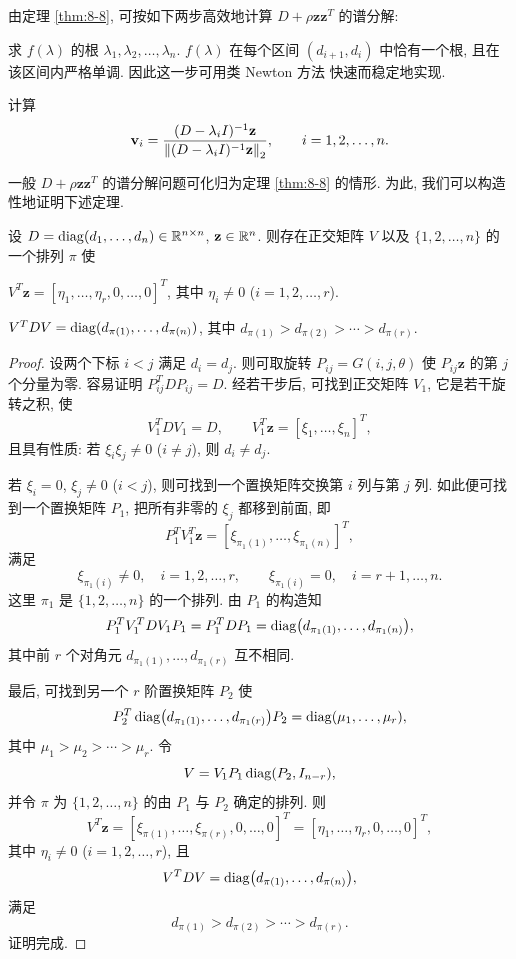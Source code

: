 由定理 \ref{thm:8-8}, 可按如下两步高效地计算 $D+\rho\mathbf{z}\mathbf{z}^T$ 的谱分解:
\begin{parenlist}
  \item 求 $f(\lambda)$ 的根 $\lambda_1,\lambda_2,\ldots,\lambda_n$. $f(\lambda)$ 在每个区间 $(d_{i+1},d_i)$ 中恰有一个根, 且在该区间内严格单调. 因此这一步可用类 Newton 方法 \cite{src:30} 快速而稳定地实现.
  \item 计算
    \[
      \mathbf{v}_i=\frac{(D-\lambda_iI)^{-1}\mathbf{z}}
      {\left\|(D-\lambda_iI)^{-1}\mathbf{z}\right\|_2},
      \qquad i=1,2,\ldots,n.
    \]
\end{parenlist}

一般 $D+\rho\mathbf{z}\mathbf{z}^T$ 的谱分解问题可化归为定理 \ref{thm:8-8} 的情形. 为此, 我们可以构造性地证明下述定理.

\begin{theorem}
\label{thm:8-9}
设 $D=\operatorname{diag}(d_1,\ldots,d_n)\in\mathbb{R}^{n\times n}$, $\mathbf{z}\in\mathbb{R}^n$. 则存在正交矩阵 $V$ 以及 $\{1,2,\ldots,n\}$ 的一个排列 $\pi$ 使
\begin{romanlist}
  \item $V^T\mathbf{z}=[\eta_1,\ldots,\eta_r,0,\ldots,0]^T$, 其中 $\eta_i\neq0$ ($i=1,2,\ldots,r$).
  \item $V^TDV=\operatorname{diag}(d_{\pi(1)},\ldots,d_{\pi(n)})$, 其中 $d_{\pi(1)}>d_{\pi(2)}>\cdots>d_{\pi(r)}$.
\end{romanlist}
\end{theorem}

\begin{proof}
设两个下标 $i<j$ 满足 $d_i=d_j$. 则可取旋转 $P_{ij}=G(i,j,\theta)$ 使 $P_{ij}\mathbf{z}$ 的第 $j$ 个分量为零. 容易证明 $P_{ij}^TDP_{ij}=D$. 经若干步后, 可找到正交矩阵 $V_1$, 它是若干旋转之积, 使
\[
  V_1^TDV_1=D,
  \qquad
  V_1^T\mathbf{z}=[\xi_1,\ldots,\xi_n]^T,
\]
且具有性质: 若 $\xi_i\xi_j\neq0$ ($i\neq j$), 则 $d_i\neq d_j$.

若 $\xi_i=0$, $\xi_j\neq0$ ($i<j$), 则可找到一个置换矩阵交换第 $i$ 列与第 $j$ 列. 如此便可找到一个置换矩阵 $P_1$, 把所有非零的 $\xi_j$ 都移到前面, 即
\[
  P_1^TV_1^T\mathbf{z}=[\xi_{\pi_1(1)},\ldots,\xi_{\pi_1(n)}]^T,
\]
满足
\[
  \xi_{\pi_1(i)}\neq0,\quad i=1,2,\ldots,r,
  \qquad
  \xi_{\pi_1(i)}=0,\quad i=r+1,\ldots,n.
\]
这里 $\pi_1$ 是 $\{1,2,\ldots,n\}$ 的一个排列. 由 $P_1$ 的构造知
\[
  P_1^TV_1^TDV_1P_1=P_1^TDP_1=\operatorname{diag}\bigl(d_{\pi_1(1)},\ldots,d_{\pi_1(n)}\bigr),
\]
其中前 $r$ 个对角元 $d_{\pi_1(1)},\ldots,d_{\pi_1(r)}$ 互不相同.

最后, 可找到另一个 $r$ 阶置换矩阵 $P_2$ 使
\[
  P_2^T\operatorname{diag}\bigl(d_{\pi_1(1)},\ldots,d_{\pi_1(r)}\bigr)P_2
  =\operatorname{diag}(\mu_1,\ldots,\mu_r),
\]
其中 $\mu_1>\mu_2>\cdots>\mu_r$. 令
\[
  V=V_1P_1\operatorname{diag}(P_2,I_{n-r}),
\]
并令 $\pi$ 为 $\{1,2,\ldots,n\}$ 的由 $P_1$ 与 $P_2$ 确定的排列. 则
\[
  V^T\mathbf{z}=[\xi_{\pi(1)},\ldots,\xi_{\pi(r)},0,\ldots,0]^T
  =[\eta_1,\ldots,\eta_r,0,\ldots,0]^T,
\]
其中 $\eta_i\neq0$ ($i=1,2,\ldots,r$), 且
\[
  V^TDV=\operatorname{diag}\bigl(d_{\pi(1)},\ldots,d_{\pi(n)}\bigr),
\]
满足
\[
  d_{\pi(1)}>d_{\pi(2)}>\cdots>d_{\pi(r)}.
\]
证明完成.
\end{proof}

